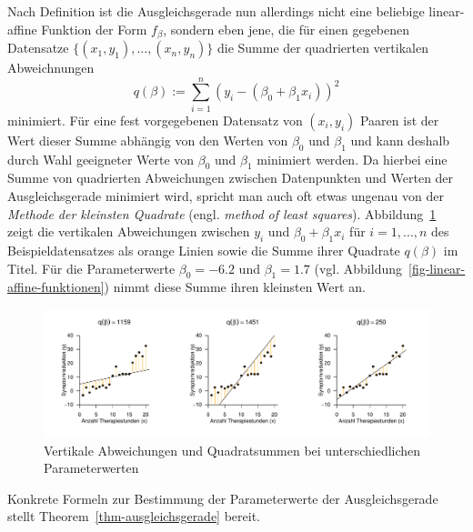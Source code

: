 \documentclass[
  letterpaper,
  DIV=11]{scrartcl}
\theoremstyle{plain}
\theoremstyle{definition}
\theoremstyle{remark}
\begin{document}
Nach Definition ist die Ausgleichsgerade nun allerdings nicht eine
beliebige linear-affine Funktion der Form \(f_\beta\), sondern eben
jene, die für einen gegebenen Datensatze \(\{(x_1,y_1),...,(x_n,y_n)\}\)
die Summe der quadrierten vertikalen Abweichnungen \begin{equation}
q(\beta) := \sum_{i=1}^n (y_i- (\beta_0 + \beta_1x_i))^2
\end{equation} minimiert. Für eine fest vorgegebenen Datensatz von
\((x_i,y_i)\) Paaren ist der Wert dieser Summe abhängig von den Werten
von \(\beta_0\) und \(\beta_1\) und kann deshalb durch Wahl geeigneter
Werte von \(\beta_0\) und \(\beta_1\) minimiert werden. Da hierbei eine
Summe von quadrierten Abweichungen zwischen Datenpunkten und Werten der
Ausgleichsgerade minimiert wird, spricht man auch oft etwas ungenau von
der \emph{Methode der kleinsten Quadrate} (engl. \emph{method of least
squares}). Abbildung~\ref{fig-vertikale-Abweichungen} zeigt die
vertikalen Abweichungen zwischen \(y_i\) und \(\beta_0 + \beta_1x_i\)
für \(i = 1,...,n\) des Beispieldatensatzes als orange Linien sowie die
Summe ihrer Quadrate \(q(\beta)\) im Titel. Für die Parameterwerte
\(\beta_0 = -6.2\) und \(\beta_1 = 1.7\) (vgl.
Abbildung~\ref{fig-linear-affine-funktionen}) nimmt diese Summe ihren
kleinsten Wert an.

\begin{figure}

{\centering \includegraphics[width=1\textwidth,height=\textheight]{./Abbildungen/reg_vertikale_Abweichungen.pdf}

}

\caption{\label{fig-vertikale-Abweichungen}Vertikale Abweichungen und
Quadratsummen bei unterschiedlichen Parameterwerten}

\end{figure}

Konkrete Formeln zur Bestimmung der Parameterwerte der Ausgleichsgerade
stellt Theorem~\ref{thm-ausgleichsgerade} bereit.
\end{document}
